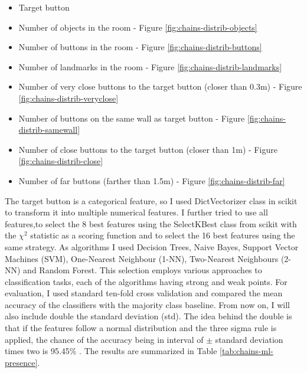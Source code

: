 \begin{itemize}
\item
Target button	
\item
Number of objects in the room - Figure \ref{fig:chains-distrib-objects}
\item
Number of buttons in the room - Figure \ref{fig:chains-distrib-buttons}
\item
Number of landmarks in the room - Figure \ref{fig:chains-distrib-landmarks}
\item
Number of very close buttons to the target button (closer than 0.3m) - Figure \ref{fig:chains-distrib-veryclose}
\item
Number of buttons on the same wall as target button - Figure \ref{fig:chains-distrib-samewall}
\item
Number of close buttons to the target button (closer than 1m) - Figure \ref{fig:chains-distrib-close}
\item
Number of far buttons (farther than 1.5m) - Figure \ref{fig:chains-distrib-far}
\end{itemize}

The target button is a categorical feature, so I used DictVectorizer class in scikit to transform it into multiple numerical features. I further tried to use all features,to  select the 8 best features using the SelectKBest class from scikit with the $\chi^2$ statistic as a scoring function and to select the 16 best features using the same strategy. As algorithms I used Decision Trees, Naive Bayes, Support Vector Machines (SVM), One-Nearest Neighbour (1-NN), Two-Nearest Neighbours (2-NN) and Random Forest. This selection employs various approaches to classification tasks, each of the algorithms having strong and weak points. For evaluation, I used standard ten-fold cross validation and compared the mean accuracy of the classifiers with the majority class baseline. From now on, I will also include double the standard deviation (std). The idea behind the double is that if the features follow a normal distribution and the three sigma rule is applied, the chance of the accuracy being in interval of $\pm$ standard deviation times two is 95.45\% . The results are summarized in Table \ref{tab:chains-ml-presence}. 


